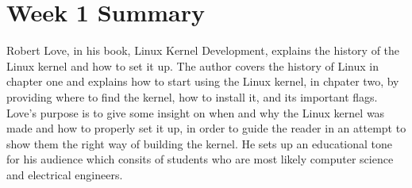 \documentclass[letterpaper, 10pt]{article}
\def\name{E. Devin Foulger}
\begin{document}


\section{Week 1 Summary}

Robert Love, in his book, Linux Kernel Development, explains the history of the Linux kernel and how to set it up. 
The author covers the history of Linux in chapter one and explains how to start using the Linux kernel, in chpater two,
by providing where to find the kernel, how to install it, and its important flags. Love's purpose is to give some
insight on when and why the Linux kernel was made and how to properly set it up, in order to guide the reader in an
attempt to show them the right way of building the kernel. He sets up an educational tone for his audience which 
consits of students who are most likely computer science and electrical engineers.
\end{document}
